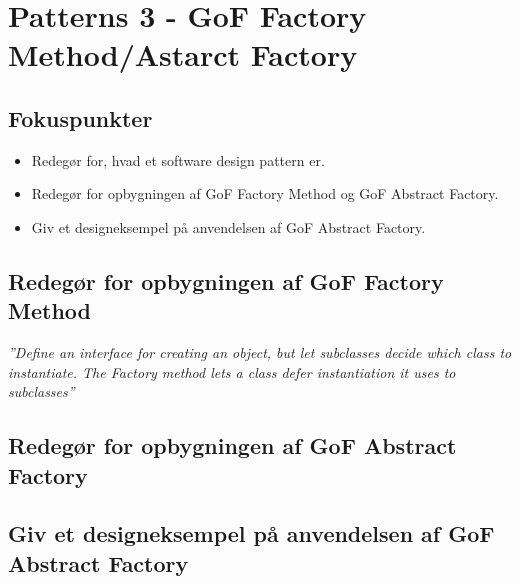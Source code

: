 \section{Patterns 3 - GoF Factory Method/Astarct Factory}

\subsection{Fokuspunkter}

\begin{itemize}
	\item Redegør for, hvad et software design pattern er.
	\item Redegør for opbygningen af GoF Factory Method og GoF Abstract Factory.
	\item Giv et designeksempel på anvendelsen af GoF Abstract Factory.
\end{itemize}



\subsection{Redegør for opbygningen af GoF Factory Method}

\textit{''Define an interface for creating an object, but let subclasses decide which class to instantiate. The Factory method lets a class defer instantiation it uses to subclasses''}



\subsection{Redegør for opbygningen af GoF Abstract Factory}
\subsection{Giv et designeksempel på anvendelsen af GoF Abstract Factory}
